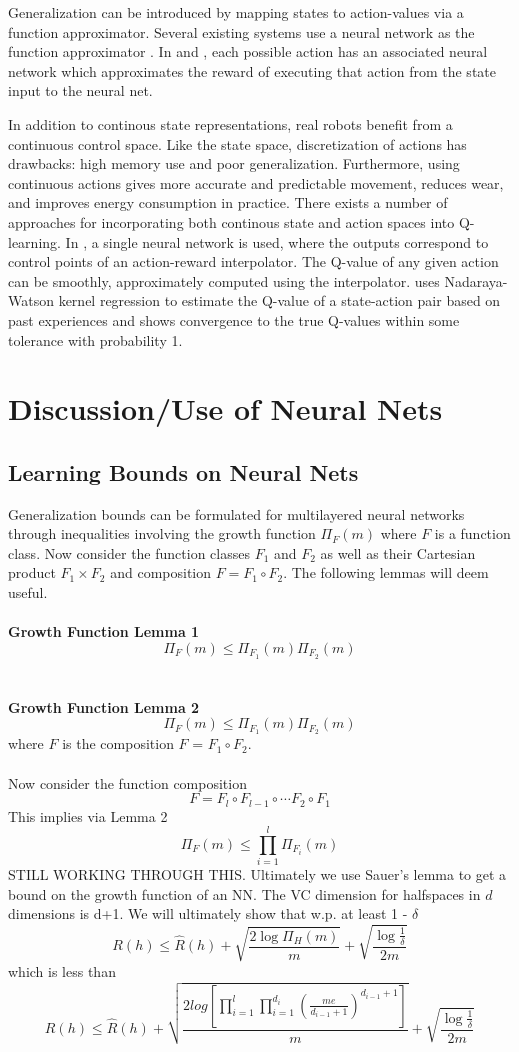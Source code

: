 \documentclass{article} %
\begin{document}
Generalization can be introduced by mapping states to action-values via a function approximator.  Several existing systems use a neural network as the function approximator \cite{lin} \cite{deep_rl} \cite{gaskett_thesis}. In \cite{lin} and \cite{deep_rl}, each possible action has an associated neural network which approximates the reward of executing that action from the state input to the neural net.  

In addition to continous state representations, real robots benefit from a continuous control space.  Like the state space, discretization of actions has drawbacks: high memory use and poor generalization.  Furthermore, using continuous actions gives more accurate and predictable movement, reduces wear, and improves energy consumption in practice\cite{gaskett_thesis}.  There exists a number of approaches for incorporating both continous state and action spaces into Q-learning.  In \cite{gaskett_thesis}, a single neural network is used, where the outputs correspond to control points of an action-reward interpolator.  The Q-value of any given action can be smoothly, approximately computed using the interpolator. \cite{carden2014} uses Nadaraya-Watson kernel regression \cite{} to estimate the Q-value of a state-action pair based on past experiences and shows convergence to the true Q-values within some tolerance with probability 1.  

\section{Discussion/Use of Neural Nets}
\subsection{Learning Bounds on Neural Nets}
Generalization bounds can be formulated for multilayered neural networks through inequalities involving the growth function $\Pi_F(m)$ where $F$ is a function class. Now consider the function classes $F_1$ and $F_2$ as well as their Cartesian product $F_1 \times F_2$ and composition $F = F_1 \circ F_2$. The following lemmas will deem useful.
\\
\\
\textbf{Growth Function Lemma 1}
$$
\Pi_F(m) \leq \Pi_{F_1}(m)\Pi_{F_2}(m)
$$
\\
\\
\textbf{Growth Function Lemma 2}
$$
\Pi_F(m) \leq \Pi_{F_1}(m)\Pi_{F_2}(m)
$$
where $F$ is the composition $F$ = $F_1 \circ F_2$.
\\
\\
Now consider the function composition
$$
F = F_l \circ F_{l-1} \circ \cdots F_2 \circ F_1
$$
This implies via Lemma 2
$$
\Pi_F(m) \leq \prod_{i=1}^l \Pi_{F_i}(m)
$$
STILL WORKING THROUGH THIS. Ultimately we use Sauer's lemma to get a bound on the growth function of an NN. The VC dimension for halfspaces in $d$ dimensions is d+1. We will ultimately show that w.p. at least 1 - $\delta$
$$
R(h) \leq \widehat{R}(h) + \sqrt{\frac{2\log{\Pi_H{(m)}}}{m}} + \sqrt{\frac{\log{\frac{1}{\delta}}}{2m}}
$$
which is less than
$$
R(h) \leq \widehat{R}(h) + \sqrt{\frac{2log[\prod_{i=1}^l\prod_{i=1}^{d_i}(\frac{me}{d_{i-1}+1})^{d_{i-1}+1}]}{m}} + \sqrt{\frac{\log{\frac{1}{\delta}}}{2m}} 
$$
\end{document}
